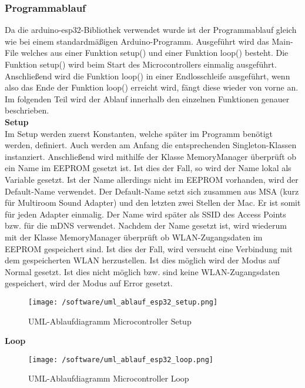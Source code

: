 \documentclass[]{article}
\begin{document}
\subsubsection{Programmablauf}
Da die arduino-esp32-Bibliothek verwendet wurde ist der Programmablauf gleich wie bei einem standardmäßigen Arduino-Programm. Ausgeführt wird das Main-File welches aus einer Funktion setup() und einer Funktion loop() besteht. Die Funktion setup() wird beim Start des Microcontrollers einmalig ausgeführt. Anschließend wird die Funktion loop() in einer Endlosschleife ausgeführt, wenn also das Ende der Funktion loop() erreicht wird, fängt diese wieder von vorne an. Im folgenden Teil wird der Ablauf innerhalb den einzelnen Funktionen genauer beschrieben. \newline \\
\textbf{Setup} \\
Im Setup werden zuerst Konstanten, welche später im Programm benötigt werden, definiert. Auch werden am Anfang die entsprechenden Singleton-Klassen instanziert. Anschließend wird mithilfe der Klasse MemoryManager überprüft ob ein Name im EEPROM gesetzt ist. Ist dies der Fall, so wird der Name lokal als Variable gesetzt. Ist der Name allerdings nicht im EEPROM vorhanden, wird der Default-Name verwendet. Der Default-Name setzt sich zusammen aus MSA (kurz für Multiroom Sound Adapter) und den letzten zwei Stellen der Mac. Er ist somit für jeden Adapter einmalig. Der Name wird später als SSID des Access Points bzw. für die mDNS verwendet. Nachdem der Name gesetzt ist, wird wiederum mit der Klasse MemoryManager überprüft ob WLAN-Zugangsdaten im EEPROM gespeichert sind. Ist dies der Fall, wird versucht eine Verbindung mit dem gespeicherten WLAN herzustellen. Ist dies möglich wird der Modus auf Normal gesetzt. Ist dies nicht möglich bzw. sind keine WLAN-Zugangsdaten gespeichert, wird der Modus auf Error gesetzt.
\begin{figure}[H]
\texttt{[image: /software/uml\_ablauf\_esp32\_setup.png]}
\caption{UML-Ablaufdiagramm Microcontroller Setup}
\end{figure}
\textbf{Loop} \\
\begin{figure}[H]
\texttt{[image: /software/uml\_ablauf\_esp32\_loop.png]}
\caption{UML-Ablaufdiagramm Microcontroller Loop}
\end{figure}
\end{document}
